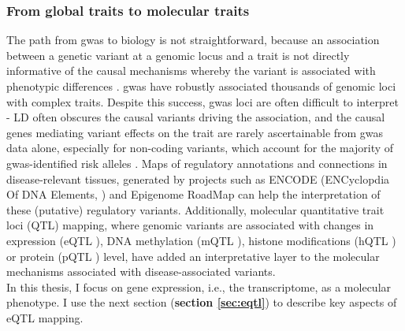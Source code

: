 
\subsubsection{From global traits to molecular traits}

The path from \gls{gwas} to biology is not straightforward, because an association between a genetic variant at a genomic locus and a trait is not directly informative of the causal mechanisms whereby the variant is associated with phenotypic differences \cite{visscher201710}. 
\gls{gwas} have robustly associated thousands of genomic loci with complex traits. 
Despite this success, \gls{gwas} loci are often difficult to interpret - LD often obscures the causal variants driving the association, and the causal genes mediating variant effects on the trait are rarely ascertainable from \gls{gwas} data alone, especially for non-coding variants, which account for the majority of \gls{gwas}-identified risk alleles \cite{manolio2009finding, gallagher2018post, wainberg2019opportunities}. 
Maps of regulatory annotations and connections in disease-relevant tissues, generated by projects such as ENCODE (ENCyclopdia Of DNA Elements, \cite{encode2004encode}) and Epigenome RoadMap \cite{kundaje2015integrative} can help the interpretation of these (putative) regulatory variants.
Additionally, molecular quantitative trait loci (QTL) mapping, where genomic variants are associated with changes in expression (eQTL \cite{schadt2003genetics}), DNA methylation (mQTL \cite{gaunt2016systematic}), histone modifications (hQTL \cite{grubert2015genetic}) or protein (pQTL \cite{melzer2008genome}) level, have added an interpretative layer to the molecular mechanisms associated with disease-associated variants.
\\

In this thesis, I focus on gene expression, i.e., the transcriptome, as a molecular phenotype.
I use the next section (\textbf{section \ref{sec:eqtl}}) to describe key aspects of eQTL mapping.


